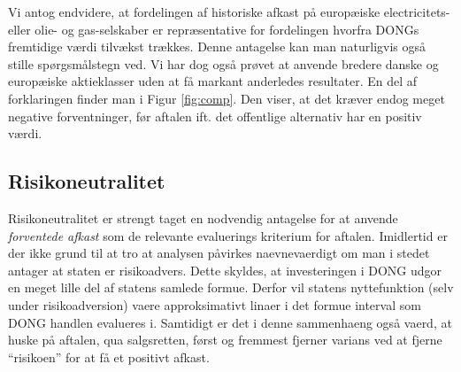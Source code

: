 \documentclass{article}
\begin{document}
\begin{appendices}
Vi antog endvidere, at fordelingen af historiske afkast på europæiske electricitets- eller olie- og gas-selskaber er repræsentative for fordelingen hvorfra DONGs fremtidige værdi tilvækst trækkes. Denne antagelse kan man naturligvis også stille spørgsmålstegn ved. Vi har dog også prøvet at anvende bredere danske og europæiske aktieklasser uden at få markant anderledes resultater. En del af forklaringen finder man i Figur \ref{fig:comp}. Den viser, at det kræver endog meget negative forventninger, før aftalen ift. det offentlige alternativ har en positiv værdi.


\subsection{Risikoneutralitet}

Risikoneutralitet er strengt taget en nodvendig antagelse for at anvende \emph{forventede afkast} som de relevante evaluerings kriterium for aftalen. Imidlertid er der ikke grund til at tro at analysen påvirkes naevnevaerdigt om man i stedet antager at staten er risikoadvers. Dette skyldes, at investeringen i DONG udgor en meget lille del af statens samlede formue. Derfor vil statens nyttefunktion (selv under risikoadversion) vaere approksimativt linaer i det formue interval som DONG handlen evalueres i. Samtidigt er det i denne sammenhaeng også vaerd, at huske på aftalen, qua salgsretten, først og fremmest fjerner varians ved at fjerne \enquote{risikoen} for at få et positivt afkast. 




\end{appendices}
\end{document}
